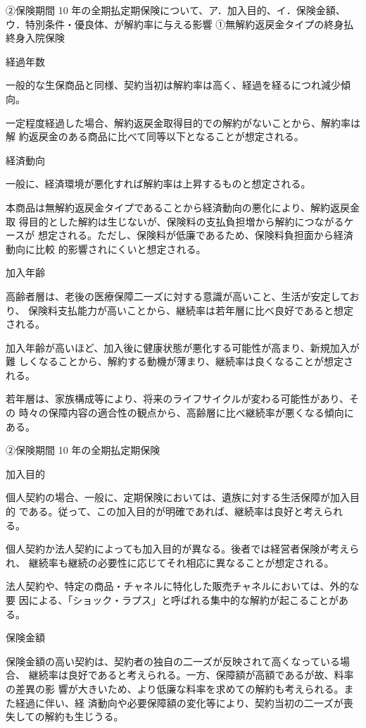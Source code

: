 \documentclass[report,gutter=10mm,fore-edge=10mm,uplatex,dvipdfmx]{jlreq}
\begin{document}
②保険期間 10 年の全期払定期保険について、ア．加入目的、イ．保険金額、ウ．特別条件・優良体、が解約率に与える影響
\answer{}
①無解約返戻金タイプの終身払終身入院保険

経過年数

一般的な生保商品と同様、契約当初は解約率は高く、経過を経るにつれ減少傾向。

一定程度経過した場合、解約返戻金取得目的での解約がないことから、解約率は解
約返戻金のある商品に比べて同等以下となることが想定される。

経済動向

一般に、経済環境が悪化すれば解約率は上昇するものと想定される。

本商品は無解約返戻金タイプであることから経済動向の悪化により、解約返戻金取
得目的とした解約は生じないが、保険料の支払負担増から解約につながるケースが
想定される。ただし、保険料が低廉であるため、保険料負担面から経済動向に比較
的影響されにくいと想定される。

加入年齢

高齢者層は、老後の医療保障二一ズに対する意識が高いこと、生活が安定しており、
保険料支払能力が高いことから、継続率は若年層に比べ良好であると想定される。

加入年齢が高いほど、加入後に健康状態が悪化する可能性が高まり、新規加入が難
しくなることから、解約する動機が薄まり、継続率は良くなることが想定される。

若年層は、家族構成等により、将来のライフサイクルが変わる可能性があり、その
時々の保障内容の適合性の観点から、高齢層に比べ継続率が悪くなる傾向にある。

②保険期間 10 年の全期払定期保険

加入目的

個人契約の場合、一般に、定期保険においては、遺族に対する生活保障が加入目的
である。従って、この加入目的が明確であれば、継続率は良好と考えられる。

個人契約か法人契約によっても加入目的が異なる。後者では経営者保険が考えられ、
継続率も継続の必要性に応じてそれ相応に異なることが想定される。

法人契約や、特定の商品・チャネルに特化した販売チャネルにおいては、外的な要
因による、「ショック・ラプス」と呼ばれる集中的な解約が起こることがある。

保険金額

保険金額の高い契約は、契約者の独自の二一ズが反映されて高くなっている場合、
継続率は良好であると考えられる。一方、保障額が高額であるが故、料率の差異の影
響が大きいため、より低廉な料率を求めての解約も考えられる。また経過に伴い、経
済動向や必要保障額の変化等により、契約当初の二一ズが喪失しての解約も生じうる。
\end{document}
